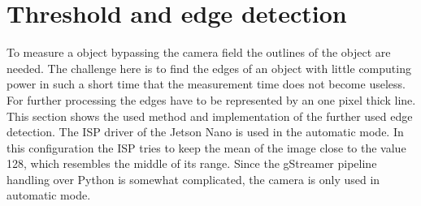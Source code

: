 \newpage
\section{Threshold and edge detection}
To measure a object bypassing the camera field the outlines of the object are needed. The challenge here is to find the edges of an object with little computing power in such a short time that the measurement time does not become useless. For further processing the edges have to be represented by an one pixel thick line. This section shows the used method and implementation of the further used edge detection. The ISP driver of the Jetson Nano is used in the automatic mode. In this configuration the ISP tries to keep the mean of the image close to the value 128, which resembles the middle of its range. Since the gStreamer pipeline handling over Python is somewhat complicated, the camera is only used in automatic mode.


